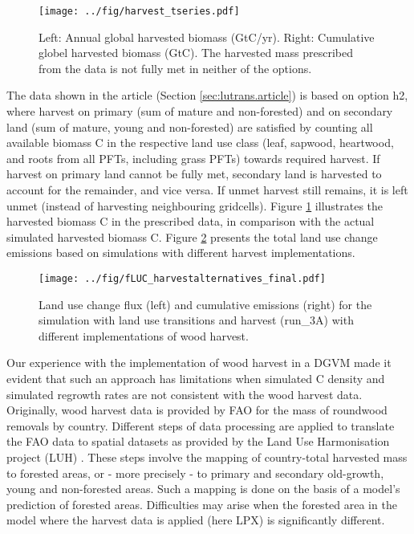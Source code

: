 \begin{figure}[ht!]
\begin{center}
  \texttt{[image: ../fig/harvest\_tseries.pdf]}
\end{center}
  \caption[Time series of annual and cumulative harvested biomass for different wood harvest implementations]{Left: Annual global harvested biomass (GtC/yr). Right: Cumulative globel harvested biomass (GtC). The harvested mass prescribed from the data is not fully met in neither of the options.}
\label{fig:harvest_tseries}
\end{figure}

The data shown in the article (Section \ref{sec:lutrans.article}) is based on option h2, where harvest on primary (sum of mature and non-forested) and on secondary land (sum of mature, young and non-forested) are satisfied by counting all available biomass C in the respective land use class (leaf, sapwood, heartwood, and roots from all PFTs, including grass PFTs) towards required harvest. If harvest on primary land cannot be fully met, secondary land is harvested to account for the remainder, and vice versa. If unmet harvest still remains, it is left unmet (instead of harvesting neighbouring gridcells). Figure \ref{fig:harvest_tseries} illustrates the harvested biomass C in the prescribed data, in comparison with the actual simulated harvested biomass C. Figure \ref{fig:fluc.harvest} presents the total land use change emissions based on simulations with different harvest implementations.\\

\begin{figure}[ht!]
  \texttt{[image: ../fig/fLUC\_harvestalternatives\_final.pdf]}
  \caption[Land use emissions time series for different wood harvest implementations]{Land use change flux (left) and cumulative emissions (right) for the simulation with land use transitions and harvest (run\_3A) with different implementations of wood harvest.}
\label{fig:fluc.harvest}
\end{figure}

Our experience with the implementation of wood harvest in a DGVM made it evident that such an approach has limitations when simulated C density and simulated regrowth rates are not consistent with the wood harvest data. Originally, wood harvest data is provided by FAO for the mass of roundwood removals by country. Different steps of data processing are applied to translate the FAO data to spatial datasets as provided by the Land Use Harmonisation project (LUH) \citep{hurtt06gcb} . These steps involve the mapping of country-total harvested mass to forested areas, or - more precisely - to primary and secondary old-growth, young and non-forested areas. Such a mapping is done on the basis of a model's prediction of forested areas. Difficulties may arise when the forested area in the model where the harvest data is applied (here LPX) is significantly different.\\

